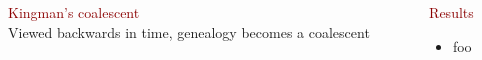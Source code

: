 \documentclass[t, aspectratio=169]{beamer}
\begin{document}
\begin{frame}
\begin{columns}
\begin{column}{0.45\textwidth}
\textcolor{darkred}{Kingman's coalescent} \\
Viewed backwards in time, genealogy becomes a coalescent
\end{column}
\begin{column}{0.45\textwidth}
\textcolor{darkred}{Results} \\
\begin{itemize}
\item foo
\end{itemize}
\end{column}
\end{columns}
\end{frame}
\end{document}
